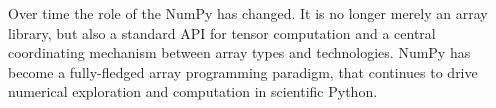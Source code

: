 Over time the role of the NumPy has changed. It is no longer merely an
array library, but also a standard API for tensor computation and a
central coordinating mechanism between array types and technologies.
NumPy has become a fully-fledged array programming paradigm, that
continues to drive numerical exploration and computation in scientific
Python.

%
%
%
%
%
